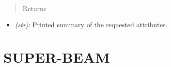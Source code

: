 \documentclass[letterpaper,10pt,english]{sphinxmanual}
\begin{document}
\begin{fulllineitems}
\begin{fulllineitems}
\begin{itemize}
\end{itemize}
\begin{quote}\begin{description}
\item[{Returns}] \leavevmode
\end{description}\end{quote}
\begin{itemize}
\item {} 
\emph{(str)}: Printed summary of the requested attributes.

\end{itemize}

\end{fulllineitems}


\end{fulllineitems}



\section{SUPER-BEAM}
\label{structures:super-beam}
\end{document}

